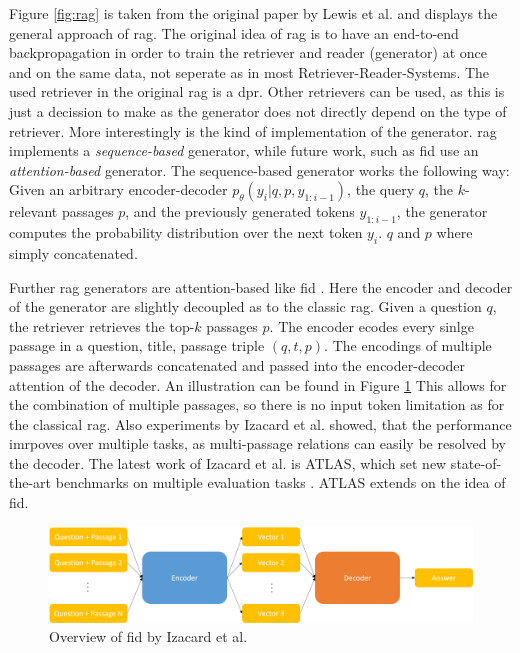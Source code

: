 Figure \ref{fig:rag} is taken from the original paper by Lewis et al. \cite{lewis_retrieval-augmented_2021} and displays the general approach of \gls{rag}. The original idea of \gls{rag} is to have an end-to-end backpropagation in order to train the retriever and reader (generator) at once and on the same data, not seperate as in most Retriever-Reader-Systems. The used retriever in the original \gls{rag} is a \gls{dpr}. Other retrievers can be used, as this is just a decission to make as the generator does not directly depend on the type of retriever. More interestingly is the kind of implementation of the generator. \gls{rag} implements a \textit{sequence-based} generator, while future work, such as \gls{fid} \cite{izacard_leveraging_2021} use an \textit{attention-based} generator. The sequence-based generator works the following way: Given an arbitrary encoder-decoder $p_{\theta}(y_i | q, p, y_{1:i-1})$, the query $q$, the $k$-relevant passages $p$, and the previously generated tokens $y_{1:i-1}$, the generator computes the probability distribution over the next token $y_i$. $q$ and $p$ where simply concatenated.

Further \gls{rag} generators are attention-based like \gls{fid} \cite{izacard_leveraging_2021}. Here the encoder and decoder of the generator are slightly decoupled as to the classic \gls{rag}. Given a question $q$, the retriever retrieves the top-$k$ passages $p$. The encoder ecodes every sinlge passage in a question, title, passage triple $(q, t, p)$. The encodings of multiple passages are afterwards concatenated and passed into the encoder-decoder attention of the decoder. An illustration can be found in Figure \ref{fig:fid} This allows for the combination of multiple passages, so there is no input token limitation as for the classical \gls{rag}. Also experiments by Izacard et al. showed, that the performance imrpoves over multiple tasks, as multi-passage relations can easily be resolved by the decoder. The latest work of Izacard et al. is ATLAS, which set new state-of-the-art benchmarks on multiple evaluation tasks \cite{izacard_atlas_2022}. ATLAS extends on the idea of \gls{fid}.   

\begin{figure}
    \centering
    \includegraphics[width=\textwidth]{Grafiken/fid.png}
    \caption{Overview of \gls{fid} by Izacard et al. \cite{izacard_leveraging_2021}}
    \label{fig:fid}
\end{figure}

